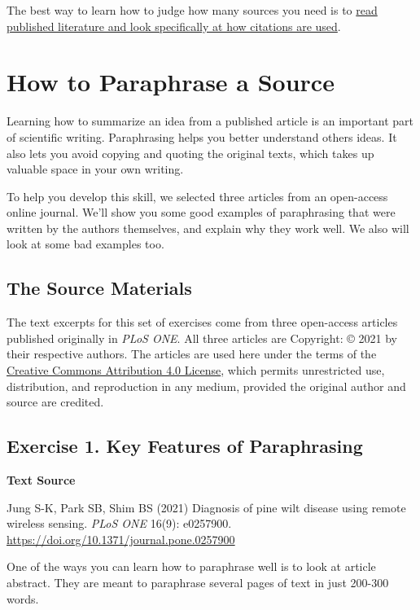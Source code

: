 \documentclass[
]{book}
\begin{document}
The best way to learn how to judge how many sources you need is to \protect\hyperlink{reading120}{read published literature and look specifically at how citations are used}.

\hypertarget{paraphrasingone506}{%
\chapter{How to Paraphrase a Source}\label{paraphrasingone506}}

Learning how to summarize an idea from a published article is an important part of scientific writing. Paraphrasing helps you better understand others ideas. It also lets you avoid copying and quoting the original texts, which takes up valuable space in your own writing.

To help you develop this skill, we selected three articles from an open-access online journal. We'll show you some good examples of paraphrasing that were written by the authors themselves, and explain why they work well. We also will look at some bad examples too.

\hypertarget{the-source-materials}{%
\section{The Source Materials}\label{the-source-materials}}

The text excerpts for this set of exercises come from three open-access articles published originally in \emph{PLoS ONE}. All three articles are Copyright: © 2021 by their respective authors. The articles are used here under the terms of the \href{http://creativecommons.org/licenses/by/4.0/}{Creative Commons Attribution 4.0 License}, which permits unrestricted use, distribution, and reproduction in any medium, provided the original author and source are credited.

\hypertarget{exercise-1.-key-features-of-paraphrasing}{%
\section{Exercise 1. Key Features of Paraphrasing}\label{exercise-1.-key-features-of-paraphrasing}}

\textbf{Text Source}

Jung S-K, Park SB, Shim BS (2021) Diagnosis of pine wilt disease using remote wireless sensing. \emph{PLoS ONE} 16(9): e0257900. \url{https://doi.org/10.1371/journal.pone.0257900}

One of the ways you can learn how to paraphrase well is to look at article abstract. They are meant to paraphrase several pages of text in just 200-300 words.
\end{document}
